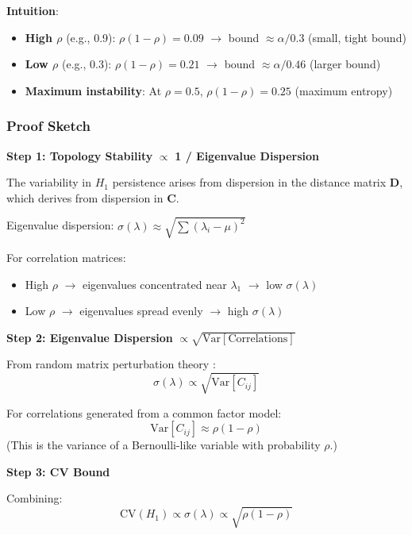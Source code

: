 \textbf{Intuition}:
\begin{itemize}
\item \textbf{High $\rho$} (e.g., 0.9): $\rho(1-\rho) = 0.09$ $\rightarrow$ bound $\approx \alpha/0.3$ (small, tight bound)
\item \textbf{Low $\rho$} (e.g., 0.3): $\rho(1-\rho) = 0.21$ $\rightarrow$ bound $\approx \alpha/0.46$ (larger bound)
\item \textbf{Maximum instability}: At $\rho = 0.5$, $\rho(1-\rho) = 0.25$ (maximum entropy)
\end{itemize}

\subsubsection{Proof Sketch}

\textbf{Step 1: Topology Stability} $\propto$ \textbf{1 / Eigenvalue Dispersion}

The variability in $H_1$ persistence arises from dispersion in the distance matrix $\mathbf{D}$, which derives from dispersion in $\mathbf{C}$.

Eigenvalue dispersion: $\sigma(\lambda) \approx \sqrt{\sum (\lambda_i - \mu)^2}$

For correlation matrices:
\begin{itemize}
\item High $\rho$ $\rightarrow$ eigenvalues concentrated near $\lambda_1$ $\rightarrow$ low $\sigma(\lambda)$
\item Low $\rho$ $\rightarrow$ eigenvalues spread evenly $\rightarrow$ high $\sigma(\lambda)$
\end{itemize}

\textbf{Step 2: Eigenvalue Dispersion} $\propto \sqrt{\text{Var}[\text{Correlations}]}$

From random matrix perturbation theory \citep{Tao2011}:
\begin{equation}
\sigma(\lambda) \propto \sqrt{\text{Var}[C_{ij}]}
\end{equation}

For correlations generated from a common factor model:
\begin{equation}
\text{Var}[C_{ij}] \approx \rho(1 - \rho)
\end{equation}
(This is the variance of a Bernoulli-like variable with probability $\rho$.)

\textbf{Step 3: CV Bound}

Combining:
\begin{equation}
\text{CV}(H_1) \propto \sigma(\lambda) \propto \sqrt{\rho(1-\rho)}
\end{equation}

